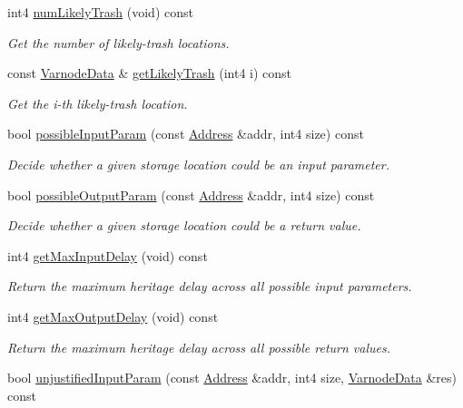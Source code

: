 \begin{DoxyCompactItemize}
int4 \mbox{\hyperlink{class_func_proto_af903eb699778675e96f0d3376b505732}{num\+Likely\+Trash}} (void) const
\begin{DoxyCompactList}\small\item\em Get the number of {\itshape likely-\/trash} locations. \end{DoxyCompactList}\item 
const \mbox{\hyperlink{struct_varnode_data}{Varnode\+Data}} \& \mbox{\hyperlink{class_func_proto_a078b7588849b80acc7c1d1ba13cda5f3}{get\+Likely\+Trash}} (int4 i) const
\begin{DoxyCompactList}\small\item\em Get the i-\/th {\itshape likely-\/trash} location. \end{DoxyCompactList}\item 
bool \mbox{\hyperlink{class_func_proto_a59ed6ca81a4b601ae81f4080a5bf89fa}{possible\+Input\+Param}} (const \mbox{\hyperlink{class_address}{Address}} \&addr, int4 size) const
\begin{DoxyCompactList}\small\item\em Decide whether a given storage location could be an input parameter. \end{DoxyCompactList}\item 
bool \mbox{\hyperlink{class_func_proto_a65c37f6adddd70f3fd17500dcacd0c92}{possible\+Output\+Param}} (const \mbox{\hyperlink{class_address}{Address}} \&addr, int4 size) const
\begin{DoxyCompactList}\small\item\em Decide whether a given storage location could be a return value. \end{DoxyCompactList}\item 
int4 \mbox{\hyperlink{class_func_proto_a07b4705cc5b9695e8c96e1e9294f0cfb}{get\+Max\+Input\+Delay}} (void) const
\begin{DoxyCompactList}\small\item\em Return the maximum heritage delay across all possible input parameters. \end{DoxyCompactList}\item 
int4 \mbox{\hyperlink{class_func_proto_a79cb1fac9b0d2d2c55d3ff4fa7db5c27}{get\+Max\+Output\+Delay}} (void) const
\begin{DoxyCompactList}\small\item\em Return the maximum heritage delay across all possible return values. \end{DoxyCompactList}\item 
bool \mbox{\hyperlink{class_func_proto_af0fe71f261f3593c98efe396973d5775}{unjustified\+Input\+Param}} (const \mbox{\hyperlink{class_address}{Address}} \&addr, int4 size, \mbox{\hyperlink{struct_varnode_data}{Varnode\+Data}} \&res) const

\end{DoxyCompactItemize}
